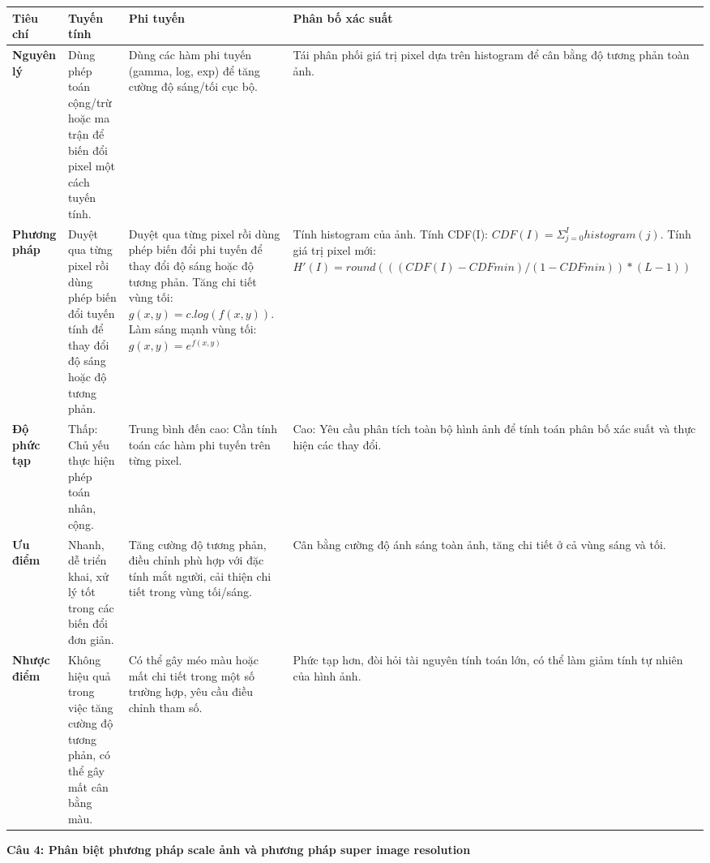 \begin{table}[H]
	\centering
	\begin{tabular}{|l|p{3cm}|p{4.5cm}|p{4.5cm}|}
		\hline
		\textbf{Tiêu chí} &
		\textbf{Tuyến tính} &
		\textbf{Phi tuyến} &
		\textbf{Phân bố xác suất} \\ \hline
		\textbf{Nguyên lý} &
		Dùng phép toán cộng/trừ hoặc ma trận để biến đổi pixel một cách tuyến tính. &
		Dùng các hàm phi tuyến (gamma, log, exp) để tăng cường độ sáng/tối cục bộ. &
		Tái phân phối giá trị pixel dựa trên histogram để cân bằng độ tương phản toàn ảnh. \\ \hline
		\textbf{Phương pháp} &
		Duyệt qua từng pixel rồi dùng phép biến đổi tuyến tính để thay đổi độ sáng hoặc độ tương phản. &
		Duyệt qua từng pixel rồi dùng phép biến đổi phi tuyến để thay đổi độ sáng hoặc độ tương phản. Tăng chi tiết vùng tối: $g(x,y) = c.log(f(x,y))$. Làm sáng mạnh vùng tối: $g(x,y) = e^{f(x,y)}$ &
		Tính histogram của ảnh. Tính CDF(I): $CDF(I) = \Sigma_{j=0}^I histogram(j)$. Tính giá trị pixel mới: $H'(I) = round(((CDF(I) - CDFmin) / (1 - CDFmin)) * (L-1))$ \\ \hline
		\textbf{Độ phức tạp} &
		Thấp: Chủ yếu thực hiện phép toán nhân, cộng. &
		Trung bình đến cao: Cần tính toán các hàm phi tuyến trên từng pixel. &
		Cao: Yêu cầu phân tích toàn bộ hình ảnh để tính toán phân bố xác suất và thực hiện các thay đổi. \\ \hline
		\textbf{Ưu điểm} &
		Nhanh, dễ triển khai, xử lý tốt trong các biến đổi đơn giản. &
		Tăng cường độ tương phản, điều chỉnh phù hợp với đặc tính mắt người, cải thiện chi tiết trong vùng tối/sáng. &
		Cân bằng cường độ ánh sáng toàn ảnh, tăng chi tiết ở cả vùng sáng và tối. \\ \hline
		\textbf{Nhược điểm} &
		Không hiệu quả trong việc tăng cường độ tương phản, có thể gây mất cân bằng màu. &
		Có thể gây méo màu hoặc mất chi tiết trong một số trường hợp, yêu cầu điều chỉnh tham số. &
		Phức tạp hơn, đòi hỏi tài nguyên tính toán lớn, có thể làm giảm tính tự nhiên của hình ảnh. \\ \hline
	\end{tabular}
\end{table}

\textbf{Câu 4: Phân biệt phương pháp scale ảnh và phương pháp super image resolution}

